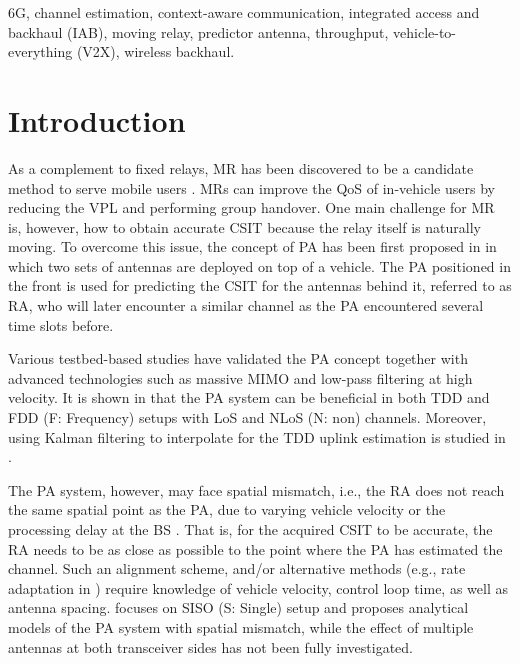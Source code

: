 \documentclass[conference]{IEEEtran}
\begin{document}
\begin{IEEEkeywords}
6G, channel estimation, context-aware communication, integrated access and backhaul (IAB), moving relay, predictor antenna, throughput, vehicle-to-everything (V2X), wireless backhaul.
\end{IEEEkeywords}


\section{Introduction}
As a complement to fixed relays, \ac{MR} has been discovered to be a candidate method to serve mobile users \cite{yutao2013moving,guo2021predictor}. \acp{MR} can improve the \ac{QoS} of in-vehicle users by reducing the \ac{VPL} and performing group handover.  One main challenge for \ac{MR} is, however, how to obtain accurate \ac{CSIT} because the relay itself is naturally moving. To overcome this issue, the concept of \ac{PA} has been first proposed in \cite{Sternad2012WCNCWusing} in which two sets of antennas are deployed on top of a vehicle.  The \ac{PA} positioned in the front is used for predicting the \ac{CSIT} for the antennas behind it, referred to as \ac{RA}, who will later encounter a similar channel as the \ac{PA} encountered several time slots before. 

Various testbed-based studies have validated the \ac{PA} concept together with advanced technologies such as massive \ac{MIMO}  \cite{phan2018WSAadaptive} and low-pass filtering \cite{BJ2017ICCWusing} at high velocity. It is shown in \cite{BJ2017PIMRCpredictor} that the \ac{PA} system can be beneficial in both \ac{TDD} and FDD (F: Frequency) setups with \ac{LoS} and NLoS (N: non) channels. Moreover, using  Kalman filtering to interpolate for the \ac{TDD} uplink estimation is studied in \cite{Apelfrojd2018PIMRCkalman}.

The \ac{PA} system, however, may face spatial mismatch, i.e., the \ac{RA} does not reach the same spatial point as the \ac{PA}, due to varying vehicle velocity or the processing delay at the \ac{BS} \cite{guo2021predictor,guo2020semilinear}. That is, for the acquired \ac{CSIT} to be accurate, the \ac{RA} needs to be as close as possible to the point where the \ac{PA} has estimated the channel. Such an alignment scheme, and/or alternative methods (e.g., rate adaptation in \cite{guo2020semilinear}) require knowledge of vehicle velocity, control loop time, as well as antenna spacing. \cite{guo2020semilinear} focuses on SISO (S: Single) setup and proposes analytical models of the \ac{PA} system with spatial mismatch, while the effect of multiple antennas at both transceiver sides has not been fully investigated.
\end{document}

